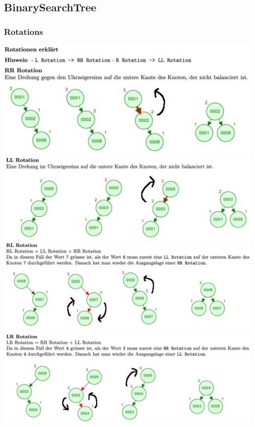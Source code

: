 \documentclass[a4paper, landscape, 8pt]{scrartcl}
\begin{document}
\begin{multicols*}{4}
            \subsection{BinarySearchTree}
                \subsubsection{Rotations}
                    \includegraphics[scale=0.15]{graphic/22_avl_baum_rr-rotation}
                    \includegraphics[scale=0.15]{graphic/23_avl_baum_ll-rotation}
                    \includegraphics[scale=0.15]{graphic/24_avl_baum_rl-rotation}
                    \includegraphics[scale=0.15]{graphic/25_avl_baum_lr-rotation}


\end{multicols*}
\end{document}
